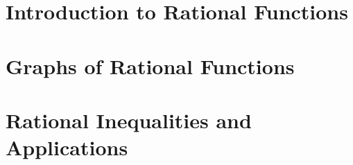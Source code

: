 \section{Introduction to Rational Functions}



\newpage

\section{Graphs of Rational Functions}



\newpage

\section{Rational Inequalities and Applications}



\newpage